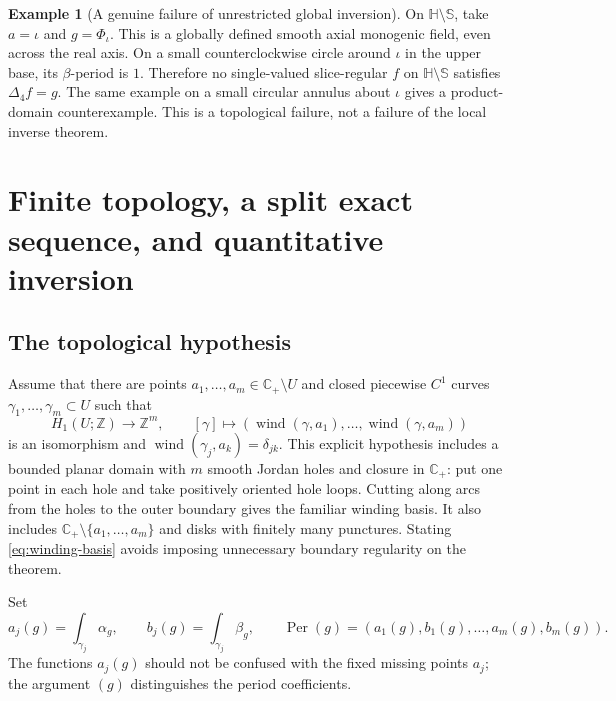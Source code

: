\documentclass[11pt,a4paper]{article}
\numberwithin{equation}{section}
\theoremstyle{definition}
\newtheorem{example}[theorem]{Example}
\theoremstyle{remark}
\newcommand{\C}{\mathbb C}
\newcommand{\HH}{\mathbb H}
\newcommand{\SSS}{\mathbb S}
\newcommand{\Z}{\mathbb Z}
\newcommand{\lap}{\Delta_4}
\newcommand{\Per}{\operatorname{Per}}
\newcommand{\ind}{\operatorname{wind}}
\begin{document}
\begin{example}[A genuine failure of unrestricted global inversion]
\label{ex:no-global}
On $\HH\setminus\SSS$, take $a=\iota$ and $g=\Phi_{\iota}$.
This is a globally defined smooth axial monogenic field, even across the
real axis. On a small counterclockwise circle around $\iota$ in the
upper base, its $\beta$-period is $1$. Therefore no single-valued
slice-regular $f$ on $\HH\setminus\SSS$ satisfies $\lap f=g$.
The same example on a small circular annulus about $\iota$ gives a
product-domain counterexample. This is a topological failure, not a
failure of the local inverse theorem.
\end{example}

\section{Finite topology, a split exact sequence, and quantitative inversion}
\label{sec:finite}

\subsection{The topological hypothesis}
Assume that there are points $a_1,\ldots,a_m\in\C_+\setminus U$ and
closed piecewise $C^1$ curves $\gamma_1,\ldots,\gamma_m\subset U$ such that
\begin{equation}\label{eq:winding-basis}
 H_1(U;\Z)\longrightarrow\Z^m,\qquad
 [\gamma]\longmapsto(\ind(\gamma,a_1),\ldots,\ind(\gamma,a_m))
\end{equation}
is an isomorphism and $\ind(\gamma_j,a_k)=\delta_{jk}$.
This explicit hypothesis includes a bounded planar domain with $m$
smooth Jordan holes and closure in $\C_+$: put one point in each hole
and take positively oriented hole loops. Cutting along arcs from the
holes to the outer boundary gives the familiar winding basis. It also
includes $\C_+\setminus\{a_1,\ldots,a_m\}$ and disks with finitely many
punctures. Stating \eqref{eq:winding-basis} avoids imposing unnecessary
boundary regularity on the theorem.

Set
\begin{equation}\label{eq:period-vector}
 a_j(g)=\int_{\gamma_j}\alpha_g,\qquad
 b_j(g)=\int_{\gamma_j}\beta_g,\qquad
 \Per(g)=(a_1(g),b_1(g),\ldots,a_m(g),b_m(g)).
\end{equation}
The functions $a_j(g)$ should not be confused with the fixed missing
points $a_j$; the argument $(g)$ distinguishes the period coefficients.
\end{document}

